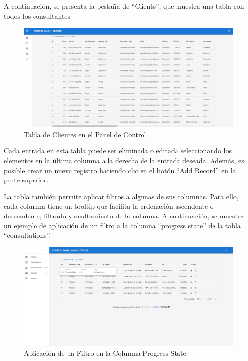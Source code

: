 A continuación, se presenta la pestaña de ``Clients'', que muestra una tabla con todos los consultantes.

\begin{figure}[H]
    \centering
    \includegraphics[width=1\linewidth]{fig/clients-real-page.png}
    \caption{Tabla de Clientes en el Panel de Control.}
    \label{fig:clients-table}
\end{figure}

Cada entrada en esta tabla puede ser eliminada o editada seleccionando los elementos en la última columna a la derecha de la entrada deseada. Además, es posible crear un nuevo registro haciendo clic en el botón ``Add Record'' en la parte superior.

La tabla también permite aplicar filtros a algunas de sus columnas. Para ello, cada columna tiene un tooltip que facilita la ordenación ascendente o descendente, filtrado y ocultamiento de la columna. A continuación, se muestra un ejemplo de aplicación de un filtro a la columna ``progress state'' de la tabla ``consultations''.

\begin{figure}[H]
    \centering
    \includegraphics[width=1\linewidth]{fig/tabla-filter.png}
    \caption{Aplicación de un Filtro en la Columna Progress State}
    \label{fig:tabla-filtro-ejemplo}
\end{figure}



